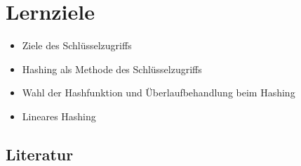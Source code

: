 \section*{Lernziele}
\begin{itemize}
	\item Ziele des Schlüsselzugriffs
	\item Hashing als Methode des Schlüsselzugriffs
	\item Wahl der Hashfunktion und Überlaufbehandlung beim Hashing
	\item Lineares Hashing
\end{itemize}


\begin{normalText}
\section*{Literatur}

\end{normalText}